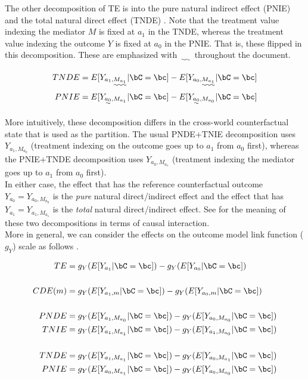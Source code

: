 \documentclass[10pt]{article}
\begin{document}
The other decomposition of TE is into the pure natural indirect effect (PNIE) and the total natural direct effect (TNDE) \cite{robinsIdentifiabilityExchangeabilityDirect1992}. Note that the treatment value indexing the mediator \(M\) is fixed at \(a_{1}\) in the TNDE, whereas the treatment value indexing the outcome \(Y\) is fixed at \(a_{0}\) in the PNIE. That is, these flipped in this decomposition. These are emphasized with \(\uwave{~~~~}\) throughout the document.

\begin{align*}
  TNDE &= E[Y_{a_{1},\uwave{M_{a_{1}}}} | \bC = \bc] - E[Y_{a_{0},\uwave{M_{a_{1}}}} | \bC = \bc]\\
  PNIE &= E[Y_{\uwave{a_{0}},M_{a_{1}}} | \bC = \bc] - E[Y_{\uwave{a_{0}},M_{a_{0}}} | \bC = \bc]\\
\end{align*}

More intuitively, these decomposition differs in the cross-world counterfactual state that is used as the partition. The usual PNDE+TNIE decomposition uses \(Y_{a_{1},M_{a_{0}}}\) (treatment indexing on the outcome goes up to \(a_{1}\) from \(a_{0}\) first), whereas the PNIE+TNDE decomposition uses \(Y_{a_{0},M_{a_{1}}}\) (treatment indexing the mediator goes up to \(a_{1}\) from \(a_{0}\) first).\\

In either case, the effect that has the reference counterfactual outcome \(Y_{a_{0}} = Y_{a_{0},M_{a_{0}}}\) is the \emph{pure} natural direct/indirect effect and the effect that has \(Y_{a_{1}} = Y_{a_{1},M_{a_{1}}}\) is the \emph{total} natural direct/indirect effect. See \cite{vanderweeleThreewayDecompositionTotal2013} for the meaning of these two decompositions in terms of causal interaction.\\

More in general, we can consider the effects on the outcome model link function (\(g_{Y}\)) scale as follows \cite{starkopfComparisonFiveSoftware2017}.

\begin{align*}
  TE &= g_{Y}(E[Y_{a_{1}} | \bC = \bc]) - g_{Y}(E[Y_{a_{0}} | \bC = \bc])\\
  \\
  CDE(m) &= g_{Y}(E[Y_{a_{1},m} | \bC = \bc]) - g_{Y}(E[Y_{a_{0},m} | \bC = \bc])\\
  \\
  PNDE &= g_{Y}(E[Y_{a_{1},M_{a_{0}}} | \bC = \bc]) - g_{Y}(E[Y_{a_{0},M_{a_{0}}} | \bC = \bc])\\
  TNIE &= g_{Y}(E[Y_{a_{1},M_{a_{1}}} | \bC = \bc]) - g_{Y}(E[Y_{a_{1},M_{a_{0}}} | \bC = \bc])\\
  \\
  TNDE &= g_{Y}(E[Y_{a_{1},M_{a_{1}}} | \bC = \bc]) - g_{Y}(E[Y_{a_{0},M_{a_{1}}} | \bC = \bc])\\
  PNIE &= g_{Y}(E[Y_{a_{0},M_{a_{1}}} | \bC = \bc]) - g_{Y}(E[Y_{a_{0},M_{a_{0}}} | \bC = \bc])\\
\end{align*}
\end{document}
